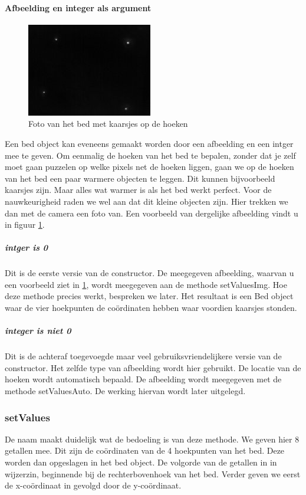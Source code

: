 \paragraph{Afbeelding en integer als argument}
\begin{figure}[hbp]
	\includegraphics[scale=0.75]{SeekCamBed}
	\caption{Foto van het bed met kaarsjes op de hoeken}
	\label{imgCBe}
\end{figure}
Een bed object kan eveneens gemaakt worden door een afbeelding en een intger mee te geven. Om eenmalig de hoeken van het bed te bepalen, zonder dat je zelf moet gaan puzzelen op welke pixels net de hoeken liggen, gaan we op de hoeken van het bed een paar warmere objecten  te leggen. Dit kunnen bijvoorbeeld kaarsjes zijn. Maar alles wat warmer is als het bed werkt perfect. Voor de nauwkeurigheid raden we wel aan dat dit kleine objecten zijn. Hier trekken we dan met de camera een foto van. Een voorbeeld van dergelijke afbeelding vindt u in figuur \ref{imgCBe}. 

\subparagraph{intger is 0}
Dit is de eerste versie van de constructor. De meegegeven afbeelding, waarvan u een voorbeeld ziet in \ref{imgCBe}, wordt meegegeven aan de methode setValuesImg. Hoe deze methode precies werkt, bespreken we later. Het resultaat is een Bed object waar de vier hoekpunten de co\"ordinaten hebben waar voordien kaarsjes stonden.

\subparagraph{integer is niet 0}
Dit is de achteraf toegevoegde maar veel gebruiksvriendelijkere versie van de constructor. Het zelfde type van afbeelding wordt hier gebruikt. De locatie van de hoeken wordt automatisch bepaald. De afbeelding wordt meegegeven met de methode setValuesAuto. De werking hiervan wordt later uitgelegd.

\subsubsection{setValues}
De naam maakt duidelijk wat de bedoeling is van deze methode. We geven hier 8 getallen mee. Dit zijn de co\"ordinaten van de 4 hoekpunten van het bed. Deze worden dan opgeslagen in het bed object. De volgorde van de getallen in in wijzerzin, beginnende bij de rechterbovenhoek van het bed. Verder geven we eerst de x-co\"ordinaat in gevolgd door de y-co\"ordinaat.

